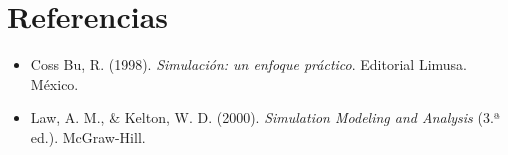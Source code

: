 \documentclass[12pt,a4paper]{article}
\begin{document}
\newpage

\section*{Referencias}

\begin{itemize}
  \item Coss Bu, R. (1998). \textit{Simulación: un enfoque práctico}. Editorial Limusa. México.
  \item Law, A. M., \& Kelton, W. D. (2000). \textit{Simulation Modeling and Analysis} (3.ª ed.). McGraw-Hill.
\end{itemize}
\end{document}
